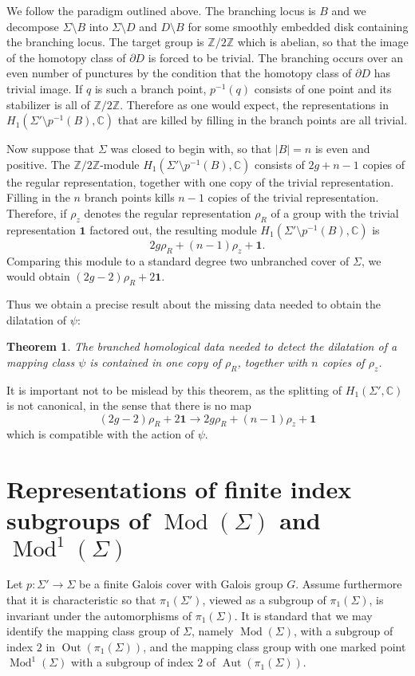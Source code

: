\documentclass[11pt]{amsart}
\newtheorem{thm}{Theorem}
\numberwithin{thm}{section}
\begin{document}
We follow the paradigm outlined above.  The branching locus is $B$ and we decompose $\Sigma\setminus B$ into $\Sigma\setminus D$ and $D\setminus B$ for some smoothly embedded disk containing the branching locus.  The target group is ${\mathbb{Z}}/2{\mathbb{Z}}$ which is abelian, so that the image of the homotopy class of $\partial D$ is forced to be trivial.  The branching occurs over an even number of punctures by the condition that the homotopy class of $\partial D$ has trivial image.  If $q$ is such a branch point, $p^{-1}(q)$ consists of one point and its stabilizer is all of ${\mathbb{Z}}/2{\mathbb{Z}}$.  Therefore as one would expect, the representations in $H_1(\Sigma'\setminus p^{-1}(B),{\mathbb{C}})$ that are killed by filling in the branch points are all trivial.

Now suppose that $\Sigma$ was closed to begin with, so that $|B|=n$ is even and positive.  The ${\mathbb{Z}}/2{\mathbb{Z}}$-module $H_1(\Sigma'\setminus p^{-1}(B),{\mathbb{C}})$ consists of $2g+n-1$ copies of the regular representation, together with one copy of the trivial representation.  Filling in the $n$ branch points kills $n-1$ copies of the trivial representation.  Therefore, if $\rho_z$ denotes the regular representation $\rho_R$ of a group with the trivial representation $\mathbf{1}$ factored out, the resulting module $H_1(\Sigma'\setminus p^{-1}(B),{\mathbb{C}})$ is \[2g\rho_R+(n-1)\rho_z+\mathbf{1}.\]  Comparing this module to a standard degree two unbranched cover of $\Sigma$, we would obtain $(2g-2)\rho_R+2\mathbf{1}$.

Thus we obtain a precise result about the missing data needed to obtain the dilatation of $\psi$:

\begin{thm}
The branched homological data needed to detect the dilatation of a mapping class $\psi$ is contained in one copy of $\rho_R$, together with $n$ copies of $\rho_z$.
\end{thm}

It is important not to be mislead by this theorem, as the splitting of $H_1(\Sigma',{\mathbb{C}})$ is not canonical, in the sense that there is no map \[(2g-2)\rho_R+2\mathbf{1}\to 2g\rho_R+(n-1)\rho_z+\mathbf{1}\] which is compatible with the action of $\psi$.

\section{Representations of finite index subgroups of ${\operatorname{Mod}}(\Sigma)$ and ${\operatorname{Mod}}^1(\Sigma)$}\label{s:MCG}
Let $p:\Sigma'\to\Sigma$ be a finite Galois cover with Galois group $G$.  Assume furthermore that it is characteristic so that $\pi_1(\Sigma')$, viewed as a subgroup of $\pi_1(\Sigma)$, is invariant under the automorphisms of $\pi_1(\Sigma)$.  It is standard that we may identify the mapping class group of $\Sigma$, namely ${\operatorname{Mod}}(\Sigma)$, with a subgroup of index $2$ in ${\operatorname{Out}}(\pi_1(\Sigma))$, and the mapping class group with one marked point ${\operatorname{Mod}}^1(\Sigma)$ with a subgroup of index $2$ of ${\operatorname{Aut}}(\pi_1(\Sigma))$.
\end{document}
